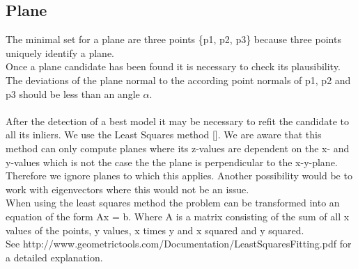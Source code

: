 \documentclass[../ClassicThesis.tex]{subfiles}
\begin{document}
\subsection{Plane}
The minimal set for a plane are three points \{p1, p2, p3\} because three points uniquely identify a plane.\\
Once a plane candidate has been found it is necessary to check its plausibility. The deviations of the plane normal to the according point normals of p1, p2 and p3 should be less than an angle $\alpha$.\\
\*\\
After the detection of a best model it may be necessary to refit the candidate to all its inliers. We use the Least Squares method []. We are aware that this method can only compute planes where its z-values are dependent on the x- and y-values which is not the case the the plane is perpendicular to the x-y-plane. Therefore we ignore planes to which this applies. Another possibility would be to work with eigenvectors where this would not be an issue.\\
When using the least squares method the problem can be transformed into an equation of the form Ax = b. Where A is a matrix consisting of the sum of all x values of the points, y values, x times y and x squared and y squared. \\
See http://www.geometrictools.com/Documentation/LeastSquaresFitting.pdf for a detailed explanation.
\end{document}
